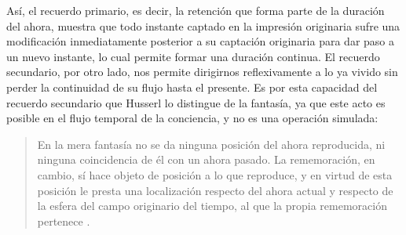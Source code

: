 Así, el recuerdo primario, es decir, la retención que forma parte de la
duración del ahora, muestra que todo instante captado en la impresión
originaria sufre una modificación inmediatamente posterior a su
captación originaria para dar paso a un nuevo instante, lo cual permite
formar una duración continua. El recuerdo secundario, por otro lado, nos
permite dirigirnos reflexivamente a lo ya vivido sin perder la
continuidad de su flujo hasta el presente. Es por esta capacidad del
recuerdo secundario que Husserl lo distingue de la fantasía, ya que este
acto es posible en el flujo temporal de la conciencia, y no es una
operación simulada:

\begin{quote}
En la mera fantasía no se da ninguna posición del ahora reproducida, ni
ninguna coincidencia de él con un ahora pasado. La rememoración, en
cambio, sí hace objeto de posición a lo que reproduce, y en virtud de
esta posición le presta una localización respecto del ahora actual y
respecto de la esfera del campo originario del tiempo, al que la propia
rememoración pertenece \cite[§23, p.~72]{husserl2002}.
\end{quote}


